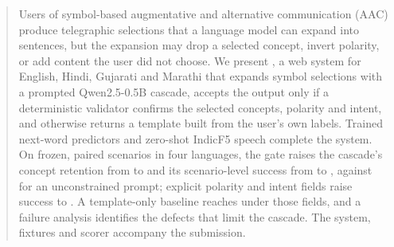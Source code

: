 \begin{abstract}
Users of symbol-based augmentative and alternative communication (AAC) produce telegraphic selections that a language model can expand into sentences, but the expansion may drop a selected concept, invert polarity, or add content the user did not choose.
We present \sys{}, a web system for English, Hindi, Gujarati and Marathi that expands symbol selections with a prompted Qwen2.5-0.5B cascade, accepts the output only if a deterministic validator confirms the selected concepts, polarity and intent, and otherwise returns a template built from the user's own labels.
Trained next-word predictors and zero-shot IndicF5 speech complete the system.
On \NPrimAll{} frozen, paired scenarios in four languages, the gate raises the cascade's concept retention from \KeptPctPre{} to \KeptPctDepU{} and its scenario-level success from \SuccPctPre{} to \SuccPctDepU{}, against \SuccPctNaive{} for an unconstrained prompt; explicit polarity and intent fields raise success to \SuccPctDepS{}.
A template-only baseline reaches \SuccPctTmplS{} under those fields, and a failure analysis identifies the defects that limit the cascade.
The system, fixtures and scorer accompany the submission.
\end{abstract}
